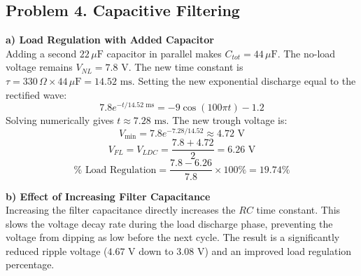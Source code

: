 \clearpage
\subsection*{Problem 4. Capacitive Filtering}
\textbf{a) Load Regulation with Added Capacitor} \\
Adding a second $22\,\mu\text{F}$ capacitor in parallel makes $C_{tot} = 44\,\mu\text{F}$. The no-load voltage remains $V_{NL} = 7.8\text{ V}$.
The new time constant is $\tau = 330\,\Omega \times 44\,\mu\text{F} = 14.52\text{ ms}$. 
Setting the new exponential discharge equal to the rectified wave:
\begin{equation*}
    7.8 e^{-t/14.52\text{ ms}} = -9\cos(100\pi t) - 1.2
\end{equation*}
Solving numerically gives $t \approx 7.28\text{ ms}$. The new trough voltage is:
\begin{equation*}
    V_{\text{min}} = 7.8 e^{-7.28/14.52} \approx 4.72\text{ V}
\end{equation*}
\begin{equation*}
    V_{FL} = V_{LDC} = \frac{7.8 + 4.72}{2} = 6.26\text{ V}
\end{equation*}
\begin{equation*}
    \%\text{ Load Regulation} = \frac{7.8 - 6.26}{7.8} \times 100\% = \mathbf{19.74\%}
\end{equation*}

\textbf{b) Effect of Increasing Filter Capacitance} \\
Increasing the filter capacitance directly increases the $RC$ time constant. This slows the voltage decay rate during the load discharge phase, preventing the voltage from dipping as low before the next cycle. The result is a significantly reduced ripple voltage ($4.67\text{ V}$ down to $3.08\text{ V}$) and an improved load regulation percentage.